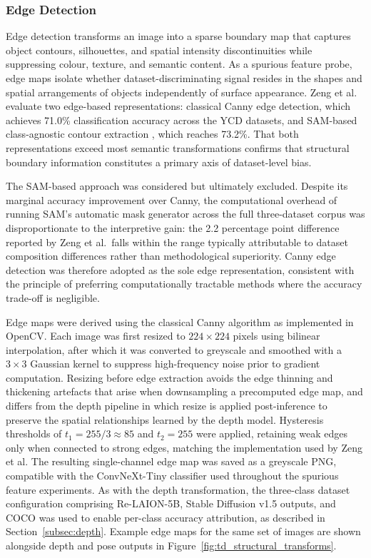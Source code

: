 \subsubsection{Edge Detection}
Edge detection transforms an image into a sparse boundary map that captures 
object contours, silhouettes, and spatial intensity discontinuities while suppressing 
colour, texture, and semantic content. As a spurious feature probe, edge maps 
isolate whether dataset-discriminating signal resides in the shapes and 
spatial arrangements of objects independently of surface appearance. Zeng 
et al.\ \cite{Zeng_2024_UnderstandingBiasinLargeScaleVisualDatasets} evaluate 
two edge-based representations: classical Canny edge detection, which achieves 
71.0\% classification accuracy across the YCD datasets, and SAM-based 
class-agnostic contour extraction \cite{Kirillov_2023_SAM}, which reaches 
73.2\%. That both representations exceed most semantic transformations confirms 
that structural boundary information constitutes a primary axis of 
dataset-level bias.

The SAM-based approach was considered but ultimately excluded. Despite its 
marginal accuracy improvement over Canny, the computational overhead of 
running SAM's automatic mask generator across the full three-dataset corpus 
was disproportionate to the interpretive gain: the 2.2 percentage point 
difference reported by Zeng et al.\ falls within the range typically attributable to 
dataset composition differences rather than methodological superiority. 
Canny edge detection was therefore adopted as the sole edge representation, 
consistent with the principle of preferring computationally tractable methods 
where the accuracy trade-off is negligible.

Edge maps were derived using the classical Canny algorithm 
\cite{Canny_1986_CannyEdgeDetection} as implemented in OpenCV. Each image was 
first resized to $224 \times 224$ pixels using bilinear interpolation, after 
which it was converted to greyscale and smoothed with a $3 \times 3$ Gaussian 
kernel to suppress high-frequency noise prior to gradient computation. 
Resizing before edge extraction avoids the edge 
thinning and thickening artefacts that arise when downsampling a 
precomputed edge map, and differs from the depth pipeline in which resize 
is applied post-inference to preserve the spatial relationships learned by 
the depth model. Hysteresis thresholds of $t_1 = 255/3 \approx 85$ and 
$t_2 = 255$ were applied, retaining weak edges only when connected to strong edges, matching the implementation used by Zeng et al. The 
resulting single-channel edge map was saved as a greyscale PNG, compatible 
with the ConvNeXt-Tiny classifier used throughout the spurious feature 
experiments. As with the depth transformation, the three-class dataset 
configuration comprising Re-LAION-5B, Stable Diffusion v1.5 outputs, and 
COCO was used to enable per-class accuracy attribution, as described in 
Section~\ref{subsec:depth}. Example edge maps for the same set of images are shown alongside 
depth and pose outputs in Figure~\ref{fig:td_structural_transforms}.

